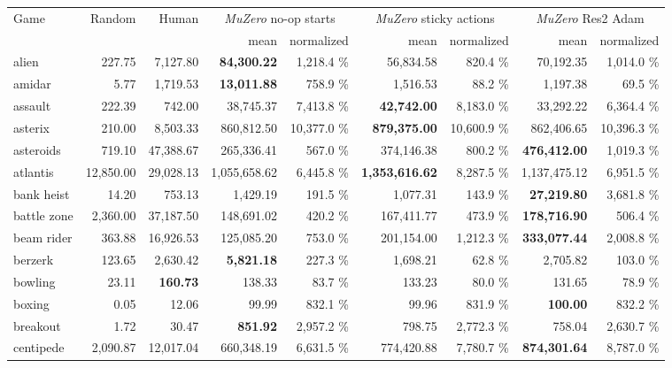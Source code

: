 \documentclass{article}
\newcommand{\muzero}{\emph{MuZero}}
\begin{document}
\begin{table}
\scriptsize

\begin{center}\begin{tabularx}{\textwidth}{X| r r r r r r r r}
\toprule
\multirow{2}{*}{Game}  & \multirow{2}{*}{Random}  & \multirow{2}{*}{Human}  & \multicolumn{2}{c}{\muzero{} no-op starts} & \multicolumn{2}{c}{\muzero{} sticky actions} & \multicolumn{2}{c}{\muzero{} Res2 Adam}\\
 & & & mean & normalized & mean & normalized & mean & normalized\\
\midrule
alien &227.75 & 7,127.80 & \textbf{84,300.22} & 1,218.4 \% & 56,834.58 & 820.4 \% & 70,192.35 & 1,014.0 \%\\
amidar &5.77 & 1,719.53 & \textbf{13,011.88} & 758.9 \% & 1,516.53 & 88.2 \% & 1,197.38 & 69.5 \%\\
assault &222.39 & 742.00 & 38,745.37 & 7,413.8 \% & \textbf{42,742.00} & 8,183.0 \% & 33,292.22 & 6,364.4 \%\\
asterix &210.00 & 8,503.33 & 860,812.50 & 10,377.0 \% & \textbf{879,375.00} & 10,600.9 \% & 862,406.65 & 10,396.3 \%\\
asteroids &719.10 & 47,388.67 & 265,336.41 & 567.0 \% & 374,146.38 & 800.2 \% & \textbf{476,412.00} & 1,019.3 \%\\
atlantis &12,850.00 & 29,028.13 & 1,055,658.62 & 6,445.8 \% & \textbf{1,353,616.62} & 8,287.5 \% & 1,137,475.12 & 6,951.5 \%\\
bank heist &14.20 & 753.13 & 1,429.19 & 191.5 \% & 1,077.31 & 143.9 \% & \textbf{27,219.80} & 3,681.8 \%\\
battle zone &2,360.00 & 37,187.50 & 148,691.02 & 420.2 \% & 167,411.77 & 473.9 \% & \textbf{178,716.90} & 506.4 \%\\
beam rider &363.88 & 16,926.53 & 125,085.20 & 753.0 \% & 201,154.00 & 1,212.3 \% & \textbf{333,077.44} & 2,008.8 \%\\
berzerk &123.65 & 2,630.42 & \textbf{5,821.18} & 227.3 \% & 1,698.21 & 62.8 \% & 2,705.82 & 103.0 \%\\
bowling &23.11 & \textbf{160.73} & 138.33 & 83.7 \% & 133.23 & 80.0 \% & 131.65 & 78.9 \%\\
boxing &0.05 & 12.06 & 99.99 & 832.1 \% & 99.96 & 831.9 \% & \textbf{100.00} & 832.2 \%\\
breakout &1.72 & 30.47 & \textbf{851.92} & 2,957.2 \% & 798.75 & 2,772.3 \% & 758.04 & 2,630.7 \%\\
centipede &2,090.87 & 12,017.04 & 660,348.19 & 6,631.5 \% & 774,420.88 & 7,780.7 \% & \textbf{874,301.64} & 8,787.0 \%\\

\end{tabularx}
\end{center}
\end{table}
\end{document}

